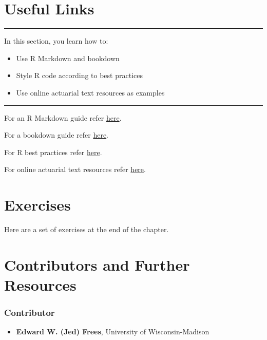 \documentclass[]{book}
\providecommand{\tightlist}{%
  \setlength{\itemsep}{0pt}\setlength{\parskip}{0pt}}
\theoremstyle{definition}
\theoremstyle{definition}
\theoremstyle{definition}
\theoremstyle{remark}
\begin{document}
\section{Useful Links}\label{S:Links}

\begin{center}\rule{0.5\linewidth}{\linethickness}\end{center}

In this section, you learn how to:

\begin{itemize}
\tightlist
\item
  Use R Markdown and bookdown
\item
  Style R code according to best practices
\item
  Use online actuarial text resources as examples
\end{itemize}

\begin{center}\rule{0.5\linewidth}{\linethickness}\end{center}

For an R Markdown guide refer
\href{https://rmarkdown.rstudio.com/authoring_pandoc_markdown.html}{here}.

For a bookdown guide refer
\href{https://bookdown.org/yihui/bookdown/}{here}.

For R best practices refer
\href{http://r-pkgs.had.co.nz/style.html}{here}.

For online actuarial text resources refer
\href{https://sites.google.com/a/wisc.edu/loss-data-analytics/online-actuarial-text-resources}{here}.

\section{Exercises}\label{exercises-1}

Here are a set of exercises at the end of the chapter.

\section{Contributors and Further
Resources}\label{further-reading-and-resources}

\subsubsection*{Contributor}\label{contributor}

\begin{itemize}
\tightlist
\item
  \textbf{Edward W. (Jed) Frees}, University of Wisconsin-Madison
\end{itemize}


\end{document}
